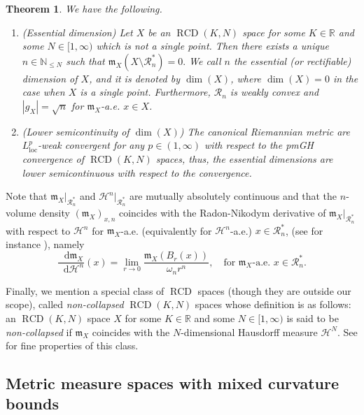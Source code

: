 \documentclass[11pt,reqno]{amsart}
\newtheorem{theorem}{Theorem}[section]
\theoremstyle{definition}
\numberwithin{equation}{section}
\newcommand{\di}{\mathop{}\!\mathrm{d}}
\newcommand{\meas}{\mathfrak{m}}
\DeclareMathOperator{\loc}{loc}
\DeclareMathOperator{\RCD}{RCD}
\newcommand{\haus}{\mathscr{H}}
\begin{document}
\begin{theorem}\label{rectifi}
We have the following.
\begin{enumerate}
    \item{(Essential dimension)} Let $X$ be an $\RCD(K, N)$ space for some $K \in \mathbb{R}$ and some $N \in [1, \infty)$ which is not a single point. Then there exists a unique $n \in \mathbb{N}_{\le N}$ such that 
$
\meas_X (X \setminus \mathcal{R}_n^*)=0.
$
We call $n$ \textit{the essential (or rectifiable) dimension} of $X$, and it is denoted by $\dim(X)$, where $\dim(X)=0$ in the case when $X$ is a single point. Furthermore, $\mathcal{R}_n$ is weakly convex and $|g_X|=\sqrt{n}$ for $\meas_X$-a.e. $x \in X$.
\item{(Lower semicontinuity of $\dim(X)$)} The canonical Riemannian metric are $L^p_{\loc}$-weak convergent for any $p \in (1, \infty)$ with respect to the pmGH convergence of $\RCD(K,N)$ spaces, thus, the essential dimensions are lower semicontinuous with respect to the convergence.
\end{enumerate}
\end{theorem}
Note that 
     $\meas_X|_{\mathcal{R}_n^*}$ and $\haus^n|_{\mathcal{R}_n^*}$ are mutually absolutely continuous and that the $n$-volume density $(\meas_X)_{x, n}$ coincides with the Radon-Nikodym derivative of $\meas_X|_{\mathcal{R}_n^*}$ with respect to $\haus^n$ for $\meas_X$-a.e. (equivalently for $\haus^n$-a.e.) $x \in \mathcal{R}_n^*$,  (see for instance \cite[Section 3.4]{HKPST}), namely
    \begin{equation}\label{asnasras9rjs}
        \frac{\di \meas_X}{\di \haus^n}(x)=\lim_{r\to 0}\frac{\meas_X(B_r(x))}{\omega_nr^n}, \quad \text{for $\meas_X$-a.e. $x \in \mathcal{R}_n^*$.}
    \end{equation}

    Finally, we mention a special class of $\RCD$ spaces (though they are outside our scope), called \textit{non-collapsed} $\RCD(K, N)$ spaces whose definition is as follows: an $\RCD(K, N)$ space $X$ for some $K \in \mathbb{R}$ and some  $N \in [1, \infty)$ is said to be \textit{non-collapsed} if $\meas_X$ coincides with the $N$-dimensional Hausdorff measure $\haus^N$. See \cite{DG, KM} for  fine properties of this class.
\subsection{Metric measure spaces with mixed curvature bounds}
\end{document}

